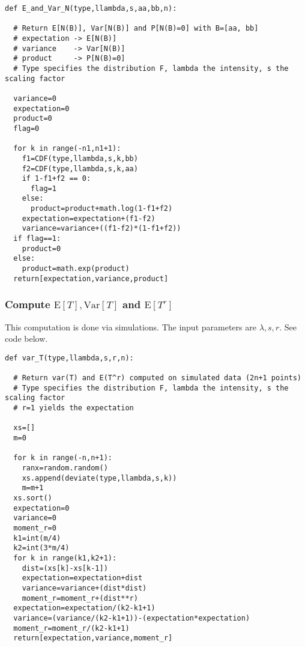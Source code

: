 \documentclass[10pt]{article}
\begin{document}
\begin{lstlisting}
def E_and_Var_N(type,llambda,s,aa,bb,n):

  # Return E[N(B)], Var[N(B)] and P[N(B)=0] with B=[aa, bb]
  # expectation -> E[N(B)]
  # variance    -> Var[N(B)]
  # product     -> P[N(B)=0]
  # Type specifies the distribution F, lambda the intensity, s the scaling factor

  variance=0
  expectation=0
  product=0
  flag=0

  for k in range(-n1,n1+1): 
    f1=CDF(type,llambda,s,k,bb)
    f2=CDF(type,llambda,s,k,aa)
    if 1-f1+f2 == 0:  
      flag=1 
    else:
      product=product+math.log(1-f1+f2)
    expectation=expectation+(f1-f2)
    variance=variance+((f1-f2)*(1-f1+f2))
  if flag==1: 
    product=0 
  else:
    product=math.exp(product)
  return[expectation,variance,product]
\end{lstlisting}
\subsubsection{Compute $\mbox{E}[T], \mbox{Var}[T]$ and $\mbox{E}[T^r]$} \label{evm}
This computation is done via simulations. The input parameters are $\lambda,s, r$. See code below. 

\begin{lstlisting}
def var_T(type,llambda,s,r,n):

  # Return var(T) and E(T^r) computed on simulated data (2n+1 points)
  # Type specifies the distribution F, lambda the intensity, s the scaling factor
  # r=1 yields the expectation

  xs=[]
  m=0

  for k in range(-n,n+1): 
    ranx=random.random()
    xs.append(deviate(type,llambda,s,k))   
    m=m+1
  xs.sort() 
  expectation=0
  variance=0
  moment_r=0
  k1=int(m/4)
  k2=int(3*m/4)
  for k in range(k1,k2+1): 
    dist=(xs[k]-xs[k-1])
    expectation=expectation+dist
    variance=variance+(dist*dist)
    moment_r=moment_r+(dist**r)
  expectation=expectation/(k2-k1+1)
  variance=(variance/(k2-k1+1))-(expectation*expectation)
  moment_r=moment_r/(k2-k1+1)
  return[expectation,variance,moment_r]

\end{lstlisting} 
\end{document}
